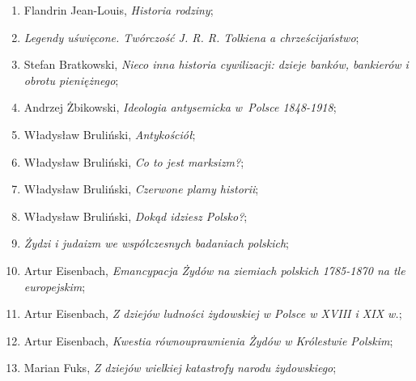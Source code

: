 \documentclass[a4paper,11pt]{article}
\begin{document}
\begin{enumerate}
\item Flandrin Jean-Louis, \textit{Historia rodziny};



\item \textit{Legendy uświęcone. Twórczość J. R. R. Tolkiena a
    chrześcijaństwo};



\item Stefan Bratkowski, \textit{Nieco inna historia cywilizacji: dzieje
    banków, bankierów i obrotu pieniężnego};



\item Andrzej Żbikowski, \textit{Ideologia antysemicka w~Polsce
    1848-1918};



\item Władysław Bruliński, \textit{Antykościół};



\item Władysław Bruliński, \textit{Co to jest marksizm?};



\item Władysław Bruliński, \textit{Czerwone plamy historii};



\item Władysław Bruliński, \textit{Dokąd idziesz Polsko?};



\item \textit{Żydzi i judaizm we współczesnych badaniach polskich};



\item Artur Eisenbach, \textit{Emancypacja Żydów na ziemiach polskich
    1785-1870 na tle europejskim};



\item Artur Eisenbach, \textit{Z dziejów ludności żydowskiej w Polsce w
    XVIII i XIX w.};



\item Artur Eisenbach, \textit{Kwestia równouprawnienia Żydów w
    Królestwie Polskim};



\item Marian Fuks, \textit{Z dziejów wielkiej katastrofy narodu
    żydowskiego};




\end{enumerate}
\end{document}

